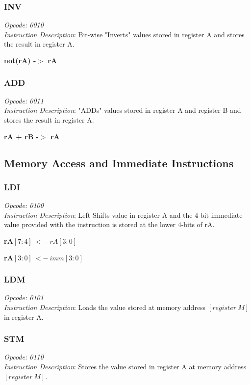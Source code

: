 \documentclass{article}
\begin{document}
\subsubsection{INV}
\textit{Opcode: 0010}  \\
\textit{Instruction Description}:  Bit-wise "Inverts" values stored in
register A and stores the result in register A. \\
\begin{center}\textbf{not(rA) -$>$ rA}\end{center}

\subsubsection{ADD}
\textit{Opcode: 0011}  \\
\textit{Instruction Description}:  "ADDs" values stored in
register A and register B and stores the result in register A.
\begin{center} \textbf{rA + rB -$>$ rA} \end{center}

\subsection{Memory Access and Immediate Instructions}

\subsubsection{LDI} 
\textit{Opcode: 0100}  \\
\textit{Instruction Description}:  Left Shifts value in register A and the
4-bit immediate value provided with the instruction is stored at the
lower 4-bits of rA.
\begin{center} \textbf{rA$[7:4] ~<- ~rA[3:0]$} \end{center} 
\begin{center} \textbf{rA$[3:0] ~<- ~imm[3:0]$} \end{center}

\subsubsection{LDM}
\textit{Opcode: 0101}  \\
\textit{Instruction Description}:  Loads the value stored at memory
address $[register ~M]$ in register A.

\subsubsection{STM}
\textit{Opcode: 0110}  \\
\textit{Instruction Description}:  Stores the value stored in register
A at memory address $[register ~M]$.
\end{document}
